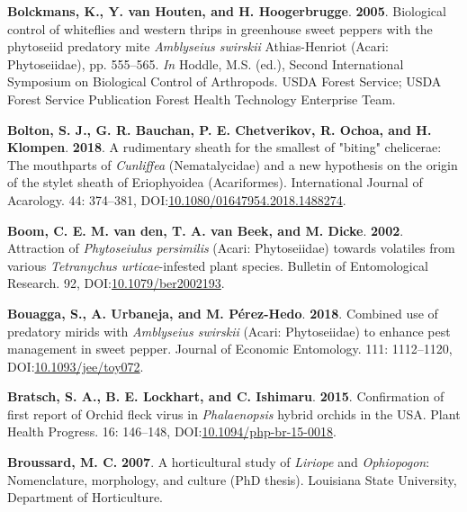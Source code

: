\documentclass[12pt,final,CPage]{ufthesis}
\newlength{\cslhangindent}
\newenvironment{CSLReferences}[2] %
{%
	\setlength{\parindent}{0pt}
	\ifodd #1 \everypar{\setlength{\hangindent}{\cslhangindent}}\ignorespaces\fi
	\ifnum #2 > 0
	\setlength{\parskip}{#2\baselineskip}
	\fi
}%
{}
\begin{document}
{\begin{CSLReferences}{1}{0}
  \leavevmode{}%
  \textbf{Bolckmans, K., Y. van Houten, and H. Hoogerbrugge}. \textbf{2005}. Biological control of whiteflies and western thrips in greenhouse sweet peppers with the phytoseiid predatory mite {\emph{Amblyseius swirskii}} {Athias-Henriot} ({Acari}: {Phytoseiidae}), pp. 555--565. \emph{In} Hoddle, M.S. (ed.), Second International Symposium on Biological Control of Arthropods. USDA Forest Service; USDA Forest Service Publication Forest Health Technology Enterprise Team.

  \leavevmode{}%
  \textbf{Bolton, S. J., G. R. Bauchan, P. E. Chetverikov, R. Ochoa, and H. Klompen}. \textbf{2018}. A rudimentary sheath for the smallest of "biting" chelicerae: The mouthparts of {\emph{Cunliffea}} ({Nematalycidae}) and a new hypothesis on the origin of the stylet sheath of {Eriophyoidea} ({Acariformes}). International Journal of Acarology. 44: 374--381, DOI:\href{https://doi.org/10.1080/01647954.2018.1488274}{10.1080/01647954.2018.1488274}.

  \leavevmode{}%
  \textbf{Boom, C. E. M. van den, T. A. van Beek, and M. Dicke}. \textbf{2002}. Attraction of {\emph{Phytoseiulus persimilis}} ({Acari}: {Phytoseiidae}) towards volatiles from various {\emph{Tetranychus urticae}}-infested plant species. Bulletin of Entomological Research. 92, DOI:\href{https://doi.org/10.1079/ber2002193}{10.1079/ber2002193}.

  \leavevmode{}%
  \textbf{Bouagga, S., A. Urbaneja, and M. Pérez-Hedo}. \textbf{2018}. Combined use of predatory mirids with {\emph{Amblyseius swirskii}} ({Acari}: {Phytoseiidae}) to enhance pest management in sweet pepper. Journal of Economic Entomology. 111: 1112--1120, DOI:\href{https://doi.org/10.1093/jee/toy072}{10.1093/jee/toy072}.

  \leavevmode{}%
  \textbf{Bratsch, S. A., B. E. Lockhart, and C. Ishimaru}. \textbf{2015}. Confirmation of first report of {Orchid fleck virus} in {\emph{Phalaenopsis}} hybrid orchids in the {USA}. Plant Health Progress. 16: 146--148, DOI:\href{https://doi.org/10.1094/php-br-15-0018}{10.1094/php-br-15-0018}.

  \leavevmode{}%
  \textbf{Broussard, M. C.} \textbf{2007}. A horticultural study of {\emph{Liriope}} and {\emph{Ophiopogon}}: Nomenclature, morphology, and culture (PhD thesis). Louisiana State University, Department of Horticulture.


\end{CSLReferences}}
\end{document}
